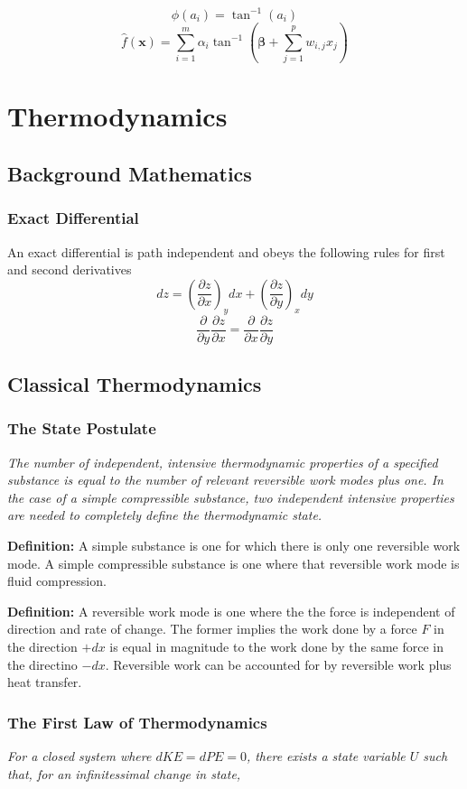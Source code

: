 \documentclass[12pt]{article}
\newcommand{\CenteredBoxed}[1]{\begin{center}\boxed{#1}\end{center}}
\newcommand{\sumlim}[2]{\sum\limits_{#1}^{#2}}
\newcommand{\boldx}{\mathbf{x}}
\newcommand{\Partial}[2]{\frac{\partial #1}{\partial #2}}
\newcommand{\PartialConst}[3]{\left(\Partial{#1}{#2}\right)_{#3}}
\begin{document}
$$\phi(a_i)=\tan^{-1}(a_i)$$
$$\hat{f}(\boldx) = \sumlim{i=1}{m}\alpha_i\tan^{-1}\left(\bm{\beta} + \sumlim{j=1}{p}w_{i,j}x_j\right)$$


\section{Thermodynamics}
\subsection{Background Mathematics}
\subsubsection{Exact Differential}
An exact differential is path independent and obeys the following rules for first and second derivatives
$$dz = \PartialConst{z}{x}{y}dx + \PartialConst{z}{y}{x}dy$$
$$\Partial{}{y}\Partial{z}{x} = \Partial{}{x}\Partial{z}{y}$$

\subsection{Classical Thermodynamics}
\subsubsection{The State Postulate}
\large\emph{The number of independent, intensive thermodynamic properties of a specified substance is equal to the number of relevant reversible work modes plus one. In the case of a simple compressible substance, two independent intensive properties are needed to completely define the thermodynamic state.}\\\normalsize

\textbf{Definition:} A simple substance is one for which there is only one reversible work mode. A simple compressible substance is one where that reversible work mode is fluid compression.

\textbf{Definition:} A reversible work mode is one where the the force is independent of direction and rate of change. The former implies the work done by a force $F$ in the direction $+dx$ is equal in magnitude to the work done by the same force in the directino $-dx$. Reversible work can be accounted for by reversible work plus heat transfer.

\subsubsection{The First Law of Thermodynamics}
\large\emph{For a closed system where $dKE=dPE=0$, there exists a state variable $U$ such that, for an infinitessimal change in state,}
\CenteredBoxed{dU=\delta Q + \delta W}
\normalsize
\end{document}
